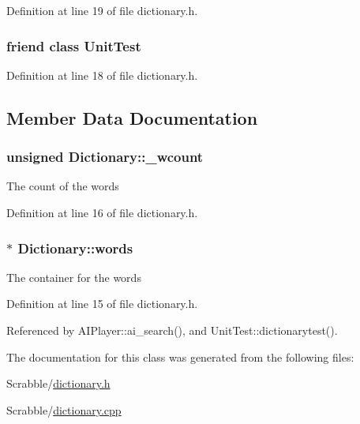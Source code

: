 Definition at line 19 of file dictionary.\-h.

\hypertarget{class_dictionary_a832b4d233efee1a32feb0f4190b30d39}{
\subsubsection[{Unit\-Test}]{\setlength{\rightskip}{0pt plus 5cm}friend class {\bf Unit\-Test}\hspace{0.3cm}{\ttfamily [friend]}}}\label{class_dictionary_a832b4d233efee1a32feb0f4190b30d39}


Definition at line 18 of file dictionary.\-h.



\subsection{Member Data Documentation}
\hypertarget{class_dictionary_aef2de3d2a839832ecc35eb6e08cc9395}{
\subsubsection[{\-\_\-wcount}]{\setlength{\rightskip}{0pt plus 5cm}unsigned Dictionary\-::\-\_\-wcount\hspace{0.3cm}{\ttfamily [private]}}}\label{class_dictionary_aef2de3d2a839832ecc35eb6e08cc9395}
The count of the words 

Definition at line 16 of file dictionary.\-h.

\hypertarget{class_dictionary_ac6c08127a37d8131fb8fb1e738406e85}{
\subsubsection[{words}]{$\ast$ Dictionary\-::words\hspace{0.3cm}{\ttfamily [private]}}}\label{class_dictionary_ac6c08127a37d8131fb8fb1e738406e85}
The container for the words 

Definition at line 15 of file dictionary.\-h.



Referenced by A\-I\-Player\-::ai\-\_\-search(), and Unit\-Test\-::dictionarytest().



The documentation for this class was generated from the following files\-:\begin{DoxyCompactItemize}
\item 
Scrabble/\hyperlink{dictionary_8h}{dictionary.\-h}\item 
Scrabble/\hyperlink{dictionary_8cpp}{dictionary.\-cpp}\end{DoxyCompactItemize}
